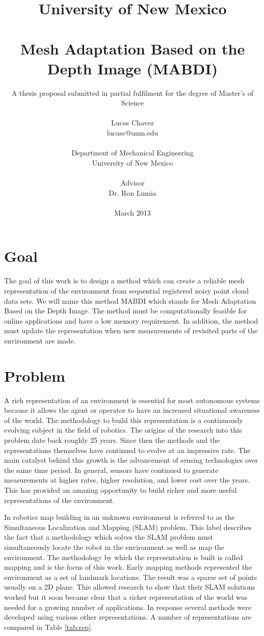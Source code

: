 \documentclass[12pt]{article}
\title{{\small University of New Mexico} \\ ~\\ 
Mesh Adaptation Based on the Depth Image (MABDI)}
\author{ 
\small A thesis proposal submitted in partial fulfilment for the degree of Master’s of Science \\ ~\\
{Lucas Chavez}  \\
{\small lucasc@unm.edu} \\ ~\\
Department of Mechanical Engineering \\ 
University of New Mexico \\ ~\\
Advisor \\ Dr. Ron Lumia \\ ~\\
March 2013
}
\date{}
\begin{document}
\pagestyle{plain}
\maketitle

\pagebreak

\tableofcontents
\pagebreak

\cleardoublepage
{}

\section{Goal}
\label{ch:goal}

The goal of this work is to design a method which can create a reliable
mesh representation of the environment from sequential registered noisy
point cloud data sets. We will name this method MABDI which stands for Mesh
Adaptation Based on the Depth Image. The method must be computationally
feasible for online applications and have a low memory requirement. In
addition, the method must update the representation when new measurements of
revisited parts of the environment are made. 

\section{Problem}
\label{ch:problem}

A rich representation of an environment is essential for most autonomous
systems because it allows the agent or operator to have an increased
situational awareness of the world.  The methodology to build this
representation is a continuously evolving subject in the field of robotics.
The origins of the research into this problem date back roughly 25 years.
Since then the methods and the representations themselves have continued to
evolve at an impressive rate. The main catalyst behind this growth is the
advancement of sensing technologies over the same time period. In general,
sensors have continued to generate measurements at higher rates, higher
resolution, and lower cost over the years. This has provided an amazing
opportunity to build richer and more useful representations of the
environment.

In robotics map building in an unknown environment is referred to as
the Simultaneous Localization and Mapping (SLAM) problem. This label
describes the fact that a methodology which solves the SLAM problem must
simultaneously locate the robot in the environment as well as map the
environment. The methodology by which the representation is built is called
mapping and is the focus of this work. Early mapping methods represented
the environment as a set of landmark locations. The result was a sparse set
of points usually on a 2D plane. This allowed research to show that their
SLAM solutions worked but it soon became clear that a richer representation
of the world was needed for a growing number of applications. In response
several methods were developed using various other representations.  A
number of representations are compared in Table \ref{tab:rep}. 
\end{document}
